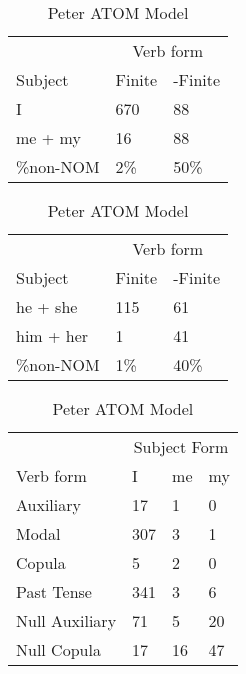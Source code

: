 \begin{table}[]
\caption{Peter ATOM Model}
    \begin{minipage}{0.5\textwidth}
    \centering
    \begin{tabular}{@{}lll@{}}
        \toprule
         & \multicolumn{2}{c}{Verb form}\\
         \cline{2-3}
        Subject & Finite & -Finite \\
        \midrule
        I & 670 & 88 \\
        me + my & 16 & 88 \\
        \hline
        \%non-NOM & 2\% & 50\% \\
        \bottomrule
    \end{tabular}
\end{minipage}
\begin{minipage}{0.5\textwidth}
    \centering
    \begin{tabular}{@{}lll@{}}
        \toprule
         & \multicolumn{2}{c}{Verb form}\\
         \cline{2-3}
        Subject & Finite & -Finite \\
        \midrule
        he + she & 115 & 61 \\
        him + her & 1 & 41 \\
        \hline
        \%non-NOM & 1\% & 40\% \\
        \bottomrule
    \end{tabular}
\end{minipage}
\begin{minipage}{0.5\textwidth}
    \centering
    \begin{tabular}{@{}llll@{}}
        \toprule
            &\multicolumn{3}{c}{Subject Form}\\
            \cline{2-4}
        Verb form & I & me & my \\
        \midrule
        Auxiliary & 17 & 1 & 0 \\
        Modal & 307 & 3 & 1 \\
        Copula & 5 & 2 & 0 \\
        Past Tense & 341 & 3 & 6 \\
        \hline
        Null Auxiliary & 71 & 5 & 20 \\
        Null Copula & 17 & 16 & 47 \\
        \bottomrule
    \end{tabular}

\end{minipage}
\end{table}
